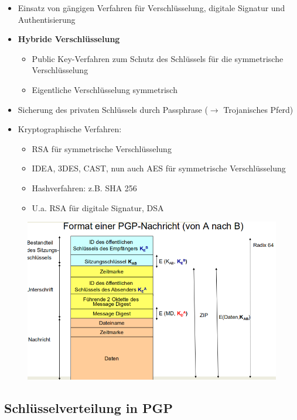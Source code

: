 \documentclass[openany]{book}
\begin{document}
\begin{itemize}
    \item Einsatz von gängigen Verfahren für Verschlüsselung, digitale Signatur und Authentisierung
    \item \textbf{Hybride Verschlüsselung}
    \begin{itemize}
        \item Public Key-Verfahren zum Schutz des Schlüssels für die symmetrische Verschlüsselung
        \item Eigentliche Verschlüsselung symmetrisch
    \end{itemize}
    \item Sicherung des privaten Schlüssels durch Passphrase ($\rightarrow$ Trojanisches Pferd)
    \item Kryptographische Verfahren:
    \begin{itemize}
        \item RSA für symmetrische Verschlüsselung
        \item IDEA, 3DES, CAST, nun auch AES für symmetrische Verschlüsselung
        \item Hashverfahren: z.B. SHA 256
        \item U.a. RSA für digitale Signatur, DSA
    \end{itemize}
\end{itemize}

\newpage

\begin{figure}[h!]
    \centering
    \includegraphics[width=0.85\linewidth]{Pics/PGP.PNG}
\end{figure} 

\subsection{Schlüsselverteilung in PGP}
\end{document}
